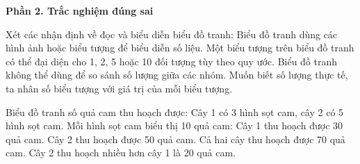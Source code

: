 \textbf{Phần 2. Trắc nghiệm đúng sai}

\begin{ex} %
Xét các nhận định về đọc và biểu diễn biểu đồ tranh:
\choiceTF
{\True Biểu đồ tranh dùng các hình ảnh hoặc biểu tượng để biểu diễn số liệu.}
{\True Một biểu tượng trên biểu đồ tranh có thể đại diện cho 1, 2, 5 hoặc 10 đối tượng tùy theo quy ước.}
{Biểu đồ tranh không thể dùng để so sánh số lượng giữa các nhóm.}
{\True Muốn biết số lượng thực tế, ta nhân số biểu tượng với giá trị của mỗi biểu tượng.}
\end{ex}

\begin{ex} %
Biểu đồ tranh số quả cam thu hoạch được: Cây 1 có 3 hình sọt cam, cây 2 có 5 hình sọt cam. Mỗi hình sọt cam biểu thị 10 quả cam:
\choiceTF
{\True Cây 1 thu hoạch được 30 quả cam.}
{\True Cây 2 thu hoạch được 50 quả cam.}
{Cả hai cây thu hoạch được 70 quả cam.}
{\True Cây 2 thu hoạch nhiều hơn cây 1 là 20 quả cam.}
\end{ex}

